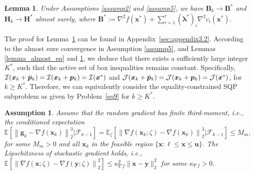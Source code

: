 \documentclass[aos]{imsart}
\numberwithin{equation}{section}
\theoremstyle{plain}
\newtheorem{assumption}{Assumption}
\newtheorem{lemma}{Lemma}
\begin{document}
\begin{lemma}
\label{lemma_almostsure_HB}
    Under Assumptions \ref{assump2} and \ref{assump5}, we have  $\bm{B}_k \to \bm{B}^{*}$ and $\bm{H}_k \to \bm{H}^{*}$ almost surely, where $\bm{B}^{*} := \nabla^2 f(\bm{x}^{*}) + \sum_{i=1}^{r} (\bm{\lambda}^{*})_{i} \nabla^2 c_i(\bm{x}^{*})$.
\end{lemma}

The proof for Lemma~\ref{lemma_almostsure_HB} can be found in Appendix~\ref{sec:appendix3.2}. According to the almost sure convergence in Assumption \ref{assump5}, and Lemmas \ref{lemma_almost_eq} and \ref{lemma_almostsure_HB}, we deduce that there exists a sufficiently large integer $K^{*}$, such that the active set of box inequalities remains constant. Specifically, $\mathcal{I}(\bm{x}_k + \Bar{\bm{p}}_k) = \mathcal{I}(\bm{x}_k + \bm{p}_k) = \mathcal{I}(\bm{x}^{*})$ and $\mathcal{J}(\bm{x}_k + \Bar{\bm{p}}_k) = \mathcal{J}(\bm{x}_k + \bm{p}_k) = \mathcal{J}(\bm{x}^{*})$, for $k \geq K^{*}$. Therefore, we can equivalently consider the equality-constrained SQP subproblem as given by Problem~\eqref{eq9} for $k \geq K^{*}$.



\begin{assumption}
\label{assump9}
Assume that the random gradient has finite third-moment, i.e., the conditioned expectation 
$$\mathbb{E}\left[ \left\|\bm{g}_k - \nabla f(\bm{x}_k) \right\|_2^3 | \mathcal{F}_{k-1} \right] = \mathbb{E}_{\zeta}\left[ \left\| \nabla f(\bm{x}_k; \zeta)  - \nabla f(\bm{x}_k) \right\|_2^3 | \mathcal{F}_{k-1} \right] \leq M_{m},$$ 
for some $M_{m}>0$ and all $\bm{x}_k$ in the feasible region $\{\bm{x}: \bm{\ell} \leq \bm{x} \leq \bm{u}\}$. The Lipschitzness of stochastic gradient holds, i.e., $\mathbb{E}\left[ \left\| \nabla f(\bm{x};\zeta) - \nabla f(\bm{y};\zeta) \right\|_2^2 \right] \leq \kappa_{\nabla f}^2 \|\bm{x} - \bm{y}\|_2^2$ for some $\kappa_{\nabla f} > 0$.
\end{assumption}
\end{document}
